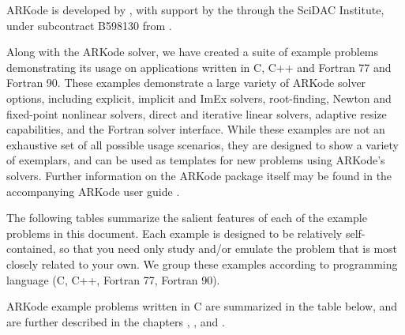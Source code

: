 \documentclass[letterpaper,10pt,english]{sphinxmanual}
\begin{document}
ARKode is developed by , with support by the  through the  SciDAC Institute, under subcontract
B598130 from .

Along with the ARKode solver, we have created a suite of example
problems demonstrating its usage on applications written in C, C++ and
Fortran 77 and Fortran 90.  These examples demonstrate a large variety
of ARKode solver options, including explicit, implicit and ImEx
solvers, root-finding, Newton and fixed-point nonlinear solvers,
direct and iterative linear solvers, adaptive resize capabilities, and
the Fortran solver interface.  While these examples are not an
exhaustive set of all possible usage scenarios, they are designed to
show a variety of exemplars, and can be used as templates for new
problems using ARKode’s solvers.  Further information on the ARKode
package itself may be found in the accompanying ARKode user guide
\label{\detokenize{index:id1}}{\hyperref[\detokenize{References:r2018}]{\sphinxcrossref{{[}R2018{]}}}}.

The following tables summarize the salient features of each of the
example problems in this document.  Each example is designed to be
relatively self-contained, so that you need only study and/or emulate
the problem that is most closely related to your own.  We group these
examples according to programming language (C, C++, Fortran 77,
Fortran 90).

ARKode example problems written in C are summarized in the table
below, and are further described in the chapters {\hyperref[\detokenize{c_serial:serial-c}]{}},
{\hyperref[\detokenize{c_openmp:openmp-c}]{}}, {\hyperref[\detokenize{c_parallel:parallel-c}]{}} and {\hyperref[\detokenize{c_parhyp:parhyp-c}]{}}.
\end{document}
